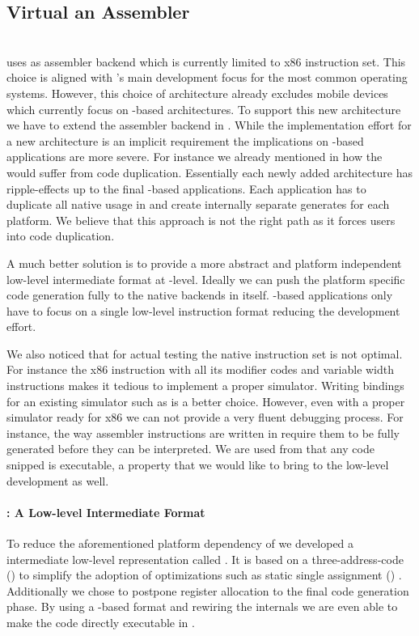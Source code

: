 \subsection{Virtual \CPU an Assembler \DSL}
\\
\B uses \AsmJIT as assembler backend which is currently limited to x86 instruction set.
This choice is aligned with \PH's main development focus for the most common operating systems.
However, this choice of architecture already excludes mobile devices which currently focus on \ARM-based architectures.
To support this new architecture we have to extend the assembler backend in \AsmJIT.
While the implementation effort for a new \AsmJIT architecture is an implicit requirement the implications on \B-based applications are more severe.
For instance we already mentioned in  how the \NB \FFI would suffer from code duplication.
Essentially each newly added \CPU architecture has ripple-effects up to the final \B-based applications.
Each \B application has to duplicate all native usage in and create internally separate generates for each platform.
We believe that this approach is not the right path as it forces \B users into code duplication.

A much better solution is to provide a more abstract and platform independent low-level intermediate format at \B-level.
Ideally we can push the platform specific code generation fully to the native backends in \B itself.
\B-based applications only have to focus on a single low-level instruction format reducing the development effort.

We also noticed that for actual testing the native instruction set is not optimal.
For instance the x86 instruction with all its modifier codes and variable width instructions makes it tedious to implement a proper simulator.
Writing bindings for an existing simulator such as  is a better choice.
However, even with a proper simulator ready for x86 we can not provide a very fluent debugging process.
For instance, the way assembler instructions are written in \B require them to be fully generated before they can be interpreted.
We are used from \PH that any code snipped is executable, a property that we would like to bring to the low-level development as well.

\paragraph{\VCPU: A Low-level Intermediate Format}
To reduce the aforementioned platform dependency of \B we developed a intermediate low-level representation called \VCPU.
It is based on a three-address-code (\TAC) to simplify the adoption of optimizations such as static single assignment (\SSA) \cite{Cytr91a}.
Additionally we chose to postpone register allocation to the final code generation phase.
By using a \TAC-based format and rewiring the internals we are even able to make the \VCPU code directly executable in \PH.

